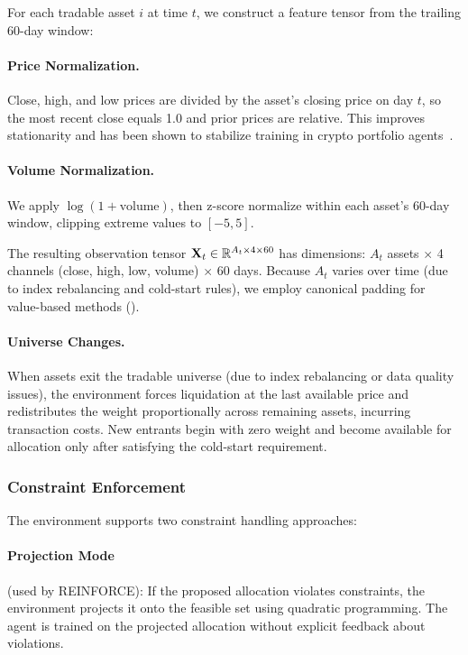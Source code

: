 For each tradable asset $i$ at time $t$, we construct a feature tensor from the trailing 60-day window:

\paragraph{Price Normalization.} Close, high, and low prices are divided by the asset's closing price on day $t$, so the most recent close equals 1.0 and prior prices are relative. This improves stationarity and has been shown to stabilize training in crypto portfolio agents~\citep{jiang2017eIIE}.

\paragraph{Volume Normalization.} We apply $\log(1 + \text{volume})$, then z-score normalize within each asset's 60-day window, clipping extreme values to $[-5, 5]$.

The resulting observation tensor $\mathbf{X}_t \in \mathbb{R}^{A_t \times 4 \times 60}$ has dimensions: $A_t$ assets $\times$ 4 channels (close, high, low, volume) $\times$ 60 days. Because $A_t$ varies over time (due to index rebalancing and cold-start rules), we employ canonical padding for value-based methods ().

\paragraph{Universe Changes.} When assets exit the tradable universe (due to index rebalancing or data quality issues), the environment forces liquidation at the last available price and redistributes the weight proportionally across remaining assets, incurring transaction costs. New entrants begin with zero weight and become available for allocation only after satisfying the cold-start requirement.

\subsubsection{Constraint Enforcement}
\label{sec:constraint_enforcement}

The environment supports two constraint handling approaches:

\paragraph{Projection Mode} (used by REINFORCE): If the proposed allocation violates constraints, the environment projects it onto the feasible set using quadratic programming. The agent is trained on the projected allocation without explicit feedback about violations.

